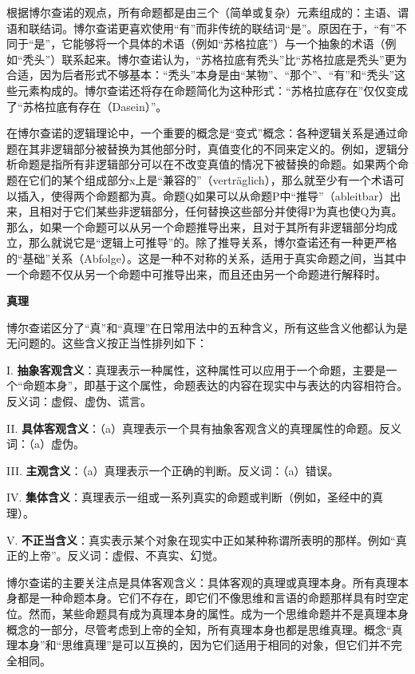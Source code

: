 根据博尔查诺的观点，所有命题都是由三个（简单或复杂）元素组成的：主语、谓语和联结词。博尔查诺更喜欢使用“有”而非传统的联结词“是”。原因在于，“有”不同于“是”，它能够将一个具体的术语（例如“苏格拉底”）与一个抽象的术语（例如“秃头”）联系起来。博尔查诺认为，“苏格拉底有秃头”比“苏格拉底是秃头”更为合适，因为后者形式不够基本：“秃头”本身是由“某物”、“那个”、“有”和“秃头”这些元素构成的。博尔查诺还将存在命题简化为这种形式：“苏格拉底存在”仅仅变成了“苏格拉底有存在（Dasein）”。

在博尔查诺的逻辑理论中，一个重要的概念是“变式”概念：各种逻辑关系是通过命题在其非逻辑部分被替换为其他部分时，真值变化的不同来定义的。例如，逻辑分析命题是指所有非逻辑部分可以在不改变真值的情况下被替换的命题。如果两个命题在它们的某个组成部分x上是“兼容的”（verträglich），那么就至少有一个术语可以插入，使得两个命题都为真。命题Q如果可以从命题P中“推导”（ableitbar）出来，且相对于它们某些非逻辑部分，任何替换这些部分并使得P为真也使Q为真。那么，如果一个命题可以从另一个命题推导出来，且对于其所有非逻辑部分均成立，那么就说它是“逻辑上可推导”的。除了推导关系，博尔查诺还有一种更严格的“基础”关系（Abfolge）。这是一种不对称的关系，适用于真实命题之间，当其中一个命题不仅从另一个命题中可推导出来，而且还由另一个命题进行解释时。

\textbf{真理}

博尔查诺区分了“真”和“真理”在日常用法中的五种含义，所有这些含义他都认为是无问题的。这些含义按正当性排列如下：

I. \textbf{抽象客观含义}：真理表示一种属性，这种属性可以应用于一个命题，主要是一个“命题本身”，即基于这个属性，命题表达的内容在现实中与表达的内容相符合。反义词：虚假、虚伪、谎言。

II. \textbf{具体客观含义}：（a）真理表示一个具有抽象客观含义的真理属性的命题。反义词：（a）虚伪。

III. \textbf{主观含义}：（a）真理表示一个正确的判断。反义词：（a）错误。

IV. \textbf{集体含义}：真理表示一组或一系列真实的命题或判断（例如，圣经中的真理）。

V. \textbf{不正当含义}：真实表示某个对象在现实中正如某种称谓所表明的那样。例如“真正的上帝”。反义词：虚假、不真实、幻觉。

博尔查诺的主要关注点是具体客观含义：具体客观的真理或真理本身。所有真理本身都是一种命题本身。它们不存在，即它们不像思维和言语的命题那样具有时空定位。然而，某些命题具有成为真理本身的属性。成为一个思维命题并不是真理本身概念的一部分，尽管考虑到上帝的全知，所有真理本身也都是思维真理。概念“真理本身”和“思维真理”是可以互换的，因为它们适用于相同的对象，但它们并不完全相同。

